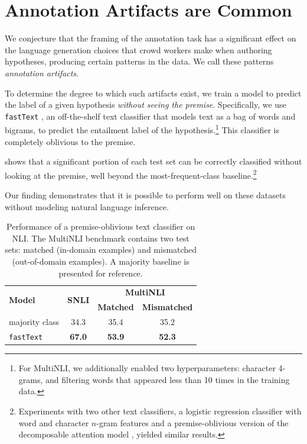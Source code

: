 \section{Annotation Artifacts are Common}
\label{ssec:artifacts}

We conjecture that the framing of the annotation task has a significant effect on the language generation choices that crowd workers make when authoring hypotheses, producing certain patterns in the data.
We call these patterns \textit{annotation artifacts}.


To determine the degree to which such artifacts exist, we train a model to predict the label of a given hypothesis \textit{without seeing the premise}.
Specifically, we use \texttt{fastText} \cite{Joulin:2017}, an off-the-shelf text classifier that models text as a bag of words and bigrams, to predict the entailment label of the hypothesis.\footnote{For MultiNLI, we additionally enabled two hyperparameters: character 4-grams, and filtering words that appeared less than 10 times in the training data.} This classifier is completely oblivious to the premise.


 shows that a significant portion of each test set can be correctly classified without looking at the premise, well beyond the most-frequent-class baseline.\footnote{Experiments with two other text classifiers, a logistic regression classifier with word and character $n$-gram features and a premise-oblivious version of the decomposable attention model \cite{Parikh:2016}, yielded similar results.}

Our finding demonstrates that it is possible to perform well on these datasets without modeling natural language inference.

\begin{table}[t]
\setlength{\tabcolsep}{4.5pt}

\centering
{
\begin{tabular}{lccc}
\toprule
\multirow{2}{*}{\textbf{Model}} & \multirow{2}{*}{\textbf{SNLI}} & \multicolumn{2}{c}{\textbf{MultiNLI}}  \\
 & & \textbf{Matched} & \textbf{Mismatched} \\
\midrule
majority class    & 34.3 & 35.4 & 35.2 \\
\texttt{fastText}        & \bf 67.0 & \bf 53.9 & \bf 52.3 \\
\bottomrule
\end{tabular}
}
\caption{Performance of a premise-oblivious text classifier on NLI. 
The MultiNLI benchmark contains two test sets: matched (in-domain examples) and mismatched (out-of-domain examples). 
A majority baseline is presented for reference.}
\label{tab:results}
\end{table}

